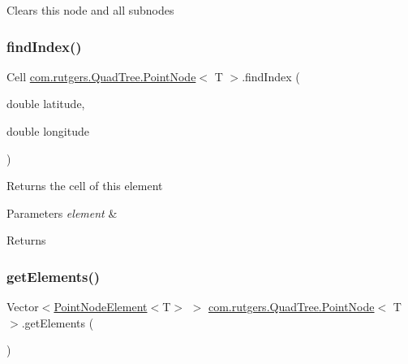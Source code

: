Clears this node and all subnodes \mbox{\label{classcom_1_1rutgers_1_1QuadTree_1_1PointNode_a6d835e3113b4c96c6300a09dd3702d81}} 
\subsubsection{\texorpdfstring{find\+Index()}{findIndex()}}
{\footnotesize\ttfamily Cell \hyperlink{classcom_1_1rutgers_1_1QuadTree_1_1PointNode}{com.\+rutgers.\+Quad\+Tree.\+Point\+Node}$<$ T $>$.find\+Index (\begin{DoxyParamCaption}\item[{double}]{latitude,  }\item[{double}]{longitude }\end{DoxyParamCaption})\hspace{0.3cm}{\ttfamily [protected]}}

Returns the cell of this element


\begin{DoxyParams}{Parameters}
{\em element} & \\
\hline
\end{DoxyParams}
\begin{DoxyReturn}{Returns}

\end{DoxyReturn}
\mbox{\label{classcom_1_1rutgers_1_1QuadTree_1_1PointNode_a59932b71d5045e3192a093ed57361140}} 
\subsubsection{\texorpdfstring{get\+Elements()}{getElements()}\hspace{0.1cm}{\footnotesize\ttfamily [1/2]}}
{\footnotesize\ttfamily Vector$<$\hyperlink{classcom_1_1rutgers_1_1QuadTree_1_1PointNodeElement}{Point\+Node\+Element}$<$T$>$ $>$ \hyperlink{classcom_1_1rutgers_1_1QuadTree_1_1PointNode}{com.\+rutgers.\+Quad\+Tree.\+Point\+Node}$<$ T $>$.get\+Elements (\begin{DoxyParamCaption}{ }\end{DoxyParamCaption})}

